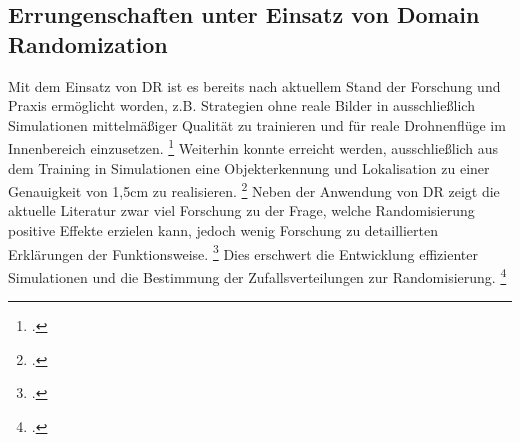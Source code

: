 \subsection{Errungenschaften unter Einsatz von Domain Randomization}

Mit dem Einsatz von DR ist es bereits nach aktuellem Stand der Forschung und Praxis ermöglicht worden, z.B. Strategien ohne reale Bilder in ausschließlich Simulationen mittelmäßiger Qualität zu trainieren und für reale Drohnenflüge im Innenbereich einzusetzen. \footcite[Vgl.][S. 1]{Sadeghi.2016} 
Weiterhin konnte erreicht werden, ausschließlich aus dem Training in Simulationen eine Objekterkennung und Lokalisation zu einer Genauigkeit von 1,5cm zu realisieren. \footcite[Vgl.][S. 1]{Tobin.2017}
Neben der Anwendung von DR zeigt die aktuelle Literatur zwar viel Forschung zu der Frage, welche Randomisierung positive Effekte erzielen kann, jedoch wenig Forschung zu detaillierten Erklärungen der Funktionsweise. \footcite[Vgl.][S. 6]{Zhao.2020}
Dies erschwert die Entwicklung effizienter Simulationen und die Bestimmung der Zufallsverteilungen zur Randomisierung. \footcite[Vgl.][S. 6]{Zhao.2020}